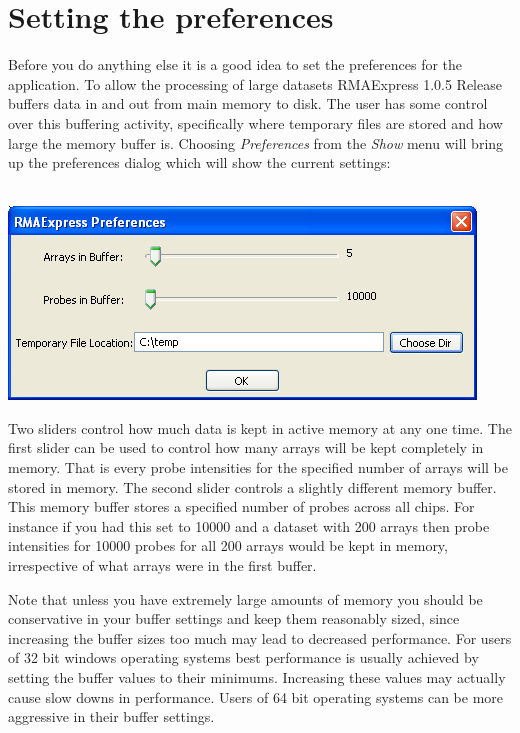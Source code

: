 \documentclass[11pt]{report}
\newcommand{\curversion}{1.0.5 Release }
\begin{document}
\section{Setting the preferences}

Before you do anything else it is a good idea to set the preferences for the application. To allow the processing of large datasets RMAExpress \curversion buffers data in and out from main memory to disk. The user has some control over this buffering activity, specifically where temporary files are stored and how large the memory buffer is. Choosing {\it Preferences} from the {\it Show} menu will bring up the preferences dialog which will show the current settings: \\ \\
\begin{center}
\includegraphics[scale=0.5]{preferenceswindow}
\end{center}
Two sliders control how much data is kept in active memory at any one time. The first slider can be used to control how many arrays will be kept completely in memory. That is every probe intensities for the specified number of arrays will be stored in memory. The second slider controls a slightly different memory buffer. This memory buffer stores a specified number of probes across all chips. For instance if you had this set to 10000 and a dataset with 200 arrays then probe intensities for 10000 probes for all 200 arrays would be kept in memory, irrespective of what arrays were in the first buffer. 


Note that unless you have extremely large amounts of memory you should be conservative in your buffer settings and keep them reasonably sized, since increasing the buffer sizes too much may lead to decreased performance. For users of 32 bit windows operating systems best performance is usually achieved by setting the buffer values to their minimums. Increasing these values may actually cause slow downs in performance. Users of 64 bit operating systems can be more aggressive in their buffer settings.
\end{document}
